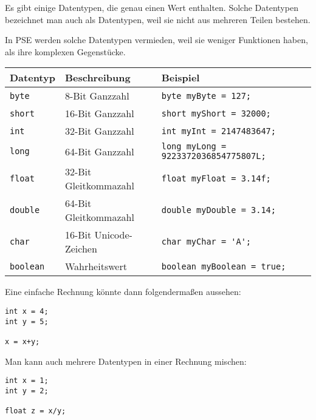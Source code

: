 \begin{Infobox}

Es gibt einige  Datentypen, die genau einen Wert enthalten.
Solche Datentypen bezeichnet man auch als  Datentypen, weil sie nicht aus mehreren Teilen bestehen.

In PSE werden solche Datentypen vermieden, weil sie weniger Funktionen haben, als ihre komplexen Gegenstücke.

\begin{center}
  \begin{tabular}{|l|l|l|}
    \hline
    \textbf{Datentyp} & \textbf{Beschreibung} & \textbf{Beispiel} \\
    \hline
    \texttt{byte} & 8-Bit Ganzzahl & \lstinline|byte myByte = 127;| \\
    \hline
    \texttt{short} & 16-Bit Ganzzahl & \lstinline|short myShort = 32000;| \\
    \hline
    \texttt{int} & 32-Bit Ganzzahl & \lstinline|int myInt = 2147483647;| \\
    \hline
    \texttt{long} & 64-Bit Ganzzahl & \lstinline|long myLong = 9223372036854775807L;| \\
    \hline
    \texttt{float} & 32-Bit Gleitkommazahl & \lstinline|float myFloat = 3.14f;| \\
    \hline
    \texttt{double} & 64-Bit Gleitkommazahl & \lstinline|double myDouble = 3.14;| \\
    \hline
    \texttt{char} & 16-Bit Unicode-Zeichen & \lstinline|char myChar = 'A';| \\
    \hline
    \texttt{boolean} & Wahrheitswert & \lstinline|boolean myBoolean = true;| \\
    \hline
  \end{tabular}
\end{center}
Eine einfache Rechnung könnte dann folgendermaßen aussehen:

\begin{lstlisting}[numbers=none]
int x = 4;
int y = 5;

x = x+y;
\end{lstlisting}

Man kann auch mehrere Datentypen in einer Rechnung mischen:\\

\begin{lstlisting}[numbers=none]
int x = 1;
int y = 2;

float z = x/y;
\end{lstlisting}

\end{Infobox}

